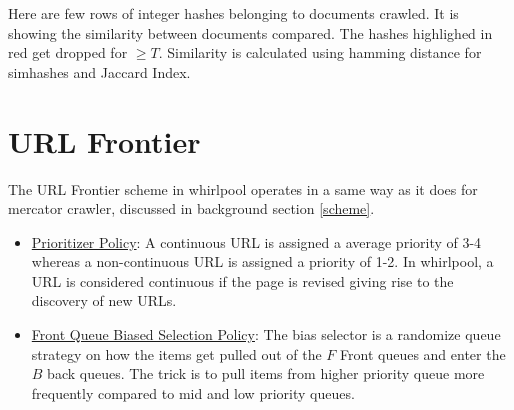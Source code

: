 \noindent
Here are few rows of integer hashes belonging to documents crawled. It is showing the similarity between
documents compared. The hashes highlighed in red get dropped for $\geq T$. Similarity is calculated using hamming distance for simhashes and Jaccard Index.
%
%

\pagebreak

\section{URL Frontier}
The URL Frontier scheme in whirlpool operates in a same way as it does for mercator crawler, discussed
in background section \ref{scheme}.

\begin{itemize}
\item \underline{Prioritizer Policy}: A continuous URL is assigned a average priority of 3-4 whereas a
  non-continuous URL is assigned a priority of 1-2. In whirlpool, a URL is considered continuous if
  the page is revised giving rise to the discovery of new URLs.
\item \underline{Front Queue Biased Selection Policy}: The bias selector is a randomize queue strategy
  on how the items get pulled out of the $F$ Front queues and enter the $B$ back queues. The trick is
  to pull items from higher priority queue more frequently compared to mid and low priority queues.
\end{itemize}

\pagebreak